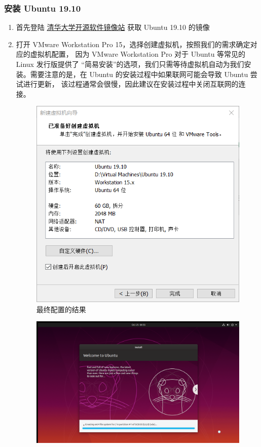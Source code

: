 \documentclass[blue,normal,cn]{elegantnote}
\begin{document}
\subsubsection{安装 Ubuntu 19.10}
\begin{enumerate}
  \item 首先登陆 \href{https://mirrors.tuna.tsinghua.edu.cn/}{清华大学开源软件镜像站}
  获取 Ubuntu 19.10 的镜像
  \item 打开 VMware Workstation Pro 15，选择创建虚拟机，按照我们的需求确定对应的虚拟机配置，
  因为 VMware Workstation Pro 对于 Ubuntu 等常见的 Linux 发行版提供了
  ``简易安装''的选项，我们只需等待虚拟机自动为我们安装。需要注意的是，在
  Ubuntu 的安装过程中如果联网可能会导致 Ubuntu 尝试进行更新，
  该过程通常会很慢，因此建议在安装过程中关闭互联网的连接。
  \begin{figure}[!htbp]
    \centering
    \includegraphics[width=.8\textwidth]{fig/lab-1/fig2-1}
    \caption{最终配置的结果}
    \label{fig:ConfFinal}
  \end{figure}
  \begin{figure}[!htbp]
    \centering
    \includegraphics[width=.8\textwidth]{fig/lab-1/fig2-2}

\end{figure}
\end{enumerate}
\end{document}
